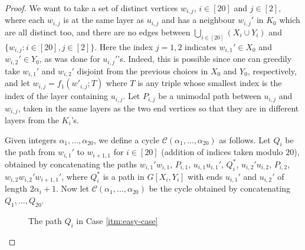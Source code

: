 \documentclass[10pt,a4paper]{amsart}
\theoremstyle{plain}
\theoremstyle{definition}
\newcommand{\C}{\mathcal{C}}
\begin{document}
\begin{proof}
		We want to take a set of distinct vertices $w_{i,j}$, $i\in[20]$ and $j \in [2]$, where each $w_{i,j}$ is at the same layer as $u_{i,j}$ and has a neighbour $w_{i,j}'$ in $K_0$ which are all distinct too, and there are no edges between $\bigcup_{i \in [20]} (X_i \cup Y_i)$ and $\{w_{i,j}: i \in [20], j \in [2]\}$. Here the index $j=1,2$ indicates $w_{i,1}'\in X_0$ and $w_{i,2}'\in Y_0$, as was done for $u_{i,j}'$'s.
        Indeed, this is possible since one can greedily take $w_{i,1}'$ and $w_{i,2}'$ disjoint from the previous choices in $X_0$ and $Y_0$, respectively, and let $w_{i,j}=f_1(w'_{i,j};T)$ where $T$ is any triple whose smallest index is the index of the layer containing $u_{i,j}$.
        Let $P_{i, j}$ be a unimodal path between $u_{i, j}$ and $w_{i, j}$, taken in the same layers as the two end vertices so that they are in different layers from the $K_i$'s. 

		Given integers $\alpha_1, \ldots, \alpha_{20}$, we define a cycle $\C(\alpha_1, \ldots, \alpha_{20})$ as follows. Let $Q_i$ be the path from $w_{i, 1}'$ to $w_{i+1, 1}$ for $i \in [20]$ (addition of indices taken modulo $20$), obtained by concatenating the paths $w_{i, 1}' w_{i, 1}$, $P_{i,1}$, $u_{i, 1} u_{i, 1}'$, $Q_i^*$, $u_{i, 2}' u_{i, 2}$, $P_{i,2}$, $w_{i, 2} w_{i, 2}' w_{i+1, 1}'$, where $Q_i^*$ is a path in $G[X_i, Y_i]$ with ends $u_{i, 1}'$ and $u_{i, 2}'$ of length $2\alpha_i + 1$. 
        Now let $\C(\alpha_1, \ldots, \alpha_{20})$ be the cycle obtained by concatenating $Q_1, \ldots, Q_{20}$.
        
        \begin{figure}[h]
            \centering

            \caption{The path $Q_i$ in Case \ref{itm:easy-case}}
            \label{fig:easy-case}
        \end{figure}
        

\end{proof}
\end{document}
